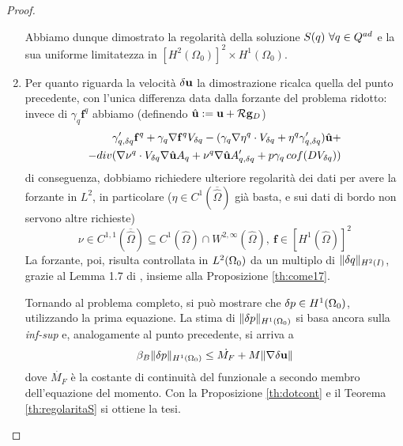 \begin{proof}
\begin{enumerate}
Abbiamo dunque dimostrato la regolarità della soluzione $S(q)\ \forall q\in Q^{ad}$ e la sua uniforme limitatezza in $[H^2(\Omega_0)]^2\times H^1(\Omega_0)$.\\

\item
Per quanto riguarda la velocità $\mathbf{\delta u}$ la dimostrazione ricalca quella del punto precedente, con l'unica differenza data dalla forzante del problema ridotto: invece di $\gamma_q\mathbf f^q$ abbiamo (definendo $\hat{\mathbf{u}}:=\mathbf{u}+\mathcal{R}\mathbf g_D$)
\begin{equation*}\begin{split}
	\gamma'_{q,{\delta q}}\mathbf f^q+\gamma_q\nabla\mathbf f^q V_{\delta q}-(\gamma_q\nabla\eta^q\cdot V_{\delta q}+\eta^q\gamma'_{q,{\delta q}})\hat{\mathbf{u}}+\\
	-div(\nabla\nu^q\cdot V_{\delta q}\nabla\hat{\mathbf{u}} A_q+\nu^q\nabla\hat{\mathbf{u}} A'_{q,{\delta q}}+p\gamma_q\,cof(DV_{\delta q}))
\end{split}\end{equation*}
di conseguenza, dobbiamo richiedere ulteriore regolarità dei dati per avere la forzante in $L^2$, in particolare ($\eta\in C^1(\overline{\hat{\Omega}})$ già basta, e sui dati di bordo non servono altre richieste)
$$\nu\in C^{1,1}(\overline{\hat{\Omega}})\subseteq C^1(\hat{\Omega})\cap W^{2,\infty}(\hat{\Omega}),\ \mathbf f \in[H^1(\hat{\Omega})]^2$$ %
La forzante, poi, risulta controllata in $L^2({\Omega_0})$ da un multiplo di $\|{\delta q}\|_{H^2(I)}$, grazie al Lemma 1.7 di \cite{Kinigera}, insieme alla Proposizione \ref{th:come17}.

Tornando al problema completo, si può mostrare che $\delta p\in H^1({\Omega_0})$, utilizzando la prima equazione. La stima di $\|\delta p\|_{H^1({\Omega_0})}$ si basa ancora sulla \emph{inf-sup} e, analogamente al punto precedente, si arriva a
$$\beta_B\|\delta p\|_{H^1({\Omega_0})}\leq \dot{M_F}+M\|\nabla\mathbf{\delta u}\|$$
dove $\dot{M_F}$ è la costante di continuità del funzionale a secondo membro dell'equazione del momento. Con la Proposizione \ref{th:dotcont} e il Teorema \ref{th:regolaritaS} si ottiene la tesi.

\end{enumerate}
\end{proof}

